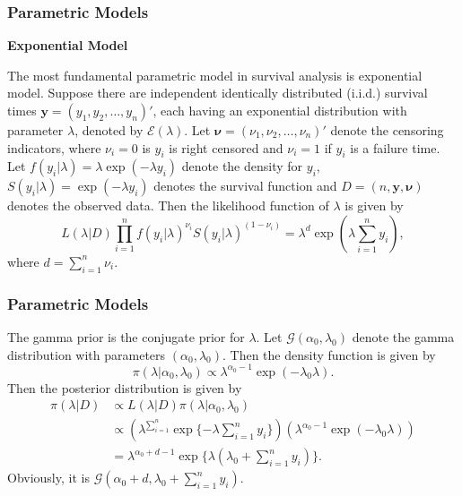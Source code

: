 \documentclass{beamer}
\begin{document}
	\begin{frame}
		\frametitle{Parametric Models}
		\textbf{Exponential Model}
		
		The most fundamental parametric model in survival analysis is exponential model. Suppose there are independent identically distributed  (i.i.d.) survival times $\boldsymbol{y} = (y_1, y_2, \dots, y_n)'$, each having an exponential distribution with parameter $\lambda$, denoted by $\mathcal{E}(\lambda)$. Let $\boldsymbol{\nu} = (\nu_1, \nu_2, \dots, \nu_n)'$ denote the censoring indicators, where $\nu_i = 0$ is $y_i$ is right censored and $\nu_i = 1$ if $y_i$ is a failure time. Let $f(y_i | \lambda) = \lambda\exp(-\lambda y_i)$ denote the density for $y_i$, $S(y_i | \lambda) = \exp(-\lambda y_i)$ denotes the survival function and $D = (n, \boldsymbol{y}, \boldsymbol{\nu})$ denotes the observed data. Then the likelihood function of $\lambda$ is given by
		\[
		L(\lambda | D) \prod_{i = 1}^{n} f(y_i | \lambda) ^ { \nu_i} S(y_i | \lambda) ^ {(1 - \nu_i)} = \lambda ^ d \exp(\lambda\sum_{i = 1}^{n}y_i),
		\]
		where $d = \sum_{i = 1}^{n}\nu_i$.
	\end{frame}
	
	\begin{frame}
		\frametitle{Parametric Models}
		The gamma prior is the conjugate prior for $\lambda$. Let $\mathcal{G}(\alpha_0, \lambda_0)$ denote the gamma distribution with parameters $(\alpha_0, \lambda_0)$. Then the density function is given by
		\[
		\pi(\lambda | \alpha_0, \lambda_0) \propto \lambda ^ {\alpha_0 - 1} \exp(-\lambda_0\lambda).
		\]
		Then the posterior distribution is given by
		\begin{align*}
			\pi(\lambda | D) & \propto L(\lambda | D) \pi(\lambda | \alpha_0, \lambda_0) \\
			& \propto ( \lambda ^ {\sum_{i = 1}^{n}}\exp\{-\lambda\sum_{i = 1}^{n}y_i\})(\lambda ^ {\alpha_0 - 1}\exp( -\lambda_0\lambda)) \\
			& = \lambda ^ {\alpha_0 + d - 1}\exp\{\lambda( \lambda_0 + \sum_{i = 1}^{n}y_i)\}.
		\end{align*}
	    Obviously, it is $\mathcal{G}(\alpha_0 + d, \lambda_0 + \sum_{i = 1}^{n}y_i)$.
	\end{frame}
	
\end{document}
